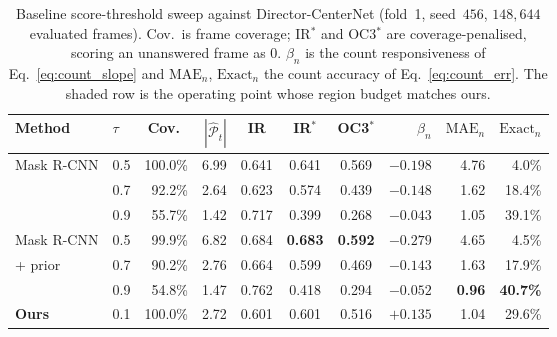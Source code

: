 \documentclass[preprint,12pt]{elsarticle}
\begin{document}
\begin{table}[t]
  \centering
  \caption{Baseline score-threshold sweep against Director-CenterNet
  (fold~1, seed~$456$, $148{,}644$ evaluated frames). Cov.\ is frame coverage;
  IR$^{\ast}$ and OC3$^{\ast}$ are coverage-penalised, scoring an unanswered
  frame as $0$. $\beta_n$ is the count responsiveness of
  Eq.~\eqref{eq:count_slope} and $\text{MAE}_n$, $\text{Exact}_n$ the count
  accuracy of Eq.~\eqref{eq:count_err}. The shaded row is the operating point
  whose region budget matches ours.}
  \label{tab:threshold}
  \begin{tabular}{llrrcccrrr}
    \toprule
    Method & $\tau$ & Cov.\ & $|\hat{\mathcal{P}}_t|$
           & IR & IR$^{\ast}$ & OC3$^{\ast}$
           & $\beta_n$ & $\text{MAE}_n$ & $\text{Exact}_n$ \\
    \midrule
    Mask R-CNN            & 0.5 & 100.0\% & 6.99 & 0.641 & 0.641 & 0.569
                          & $-0.198$ & 4.76 & \phantom{0}4.0\% \\
                          & 0.7 & \phantom{0}92.2\% & 2.64 & 0.623 & 0.574 & 0.439
                          & $-0.148$ & 1.62 & 18.4\% \\
                          & 0.9 & \phantom{0}55.7\% & 1.42 & 0.717 & 0.399 & 0.268
                          & $-0.043$ & 1.05 & 39.1\% \\
    \midrule
    Mask R-CNN            & 0.5 & \phantom{0}99.9\% & 6.82 & 0.684
                          & \textbf{0.683} & \textbf{0.592}
                          & $-0.279$ & 4.65 & \phantom{0}4.5\% \\
    \quad + prior         & 0.7 & \phantom{0}90.2\% & 2.76 & 0.664 & 0.599 & 0.469
                          & $-0.143$ & 1.63 & 17.9\% \\
                          & 0.9 & \phantom{0}54.8\% & 1.47 & 0.762 & 0.418 & 0.294
                          & $-0.052$ & \textbf{0.96} & \textbf{40.7\%} \\
    \midrule
    \textbf{Ours}         & 0.1 & 100.0\% & 2.72 & 0.601 & 0.601 & 0.516
                          & $\mathbf{+0.135}$ & 1.04 & 29.6\% \\
    \bottomrule
  \end{tabular}
\end{table}
\end{document}
